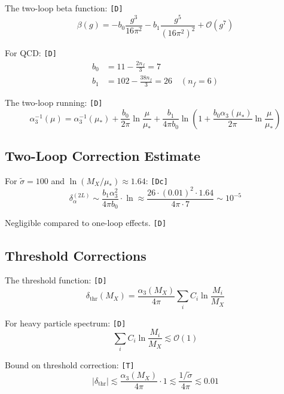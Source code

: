 \documentclass[11pt,a4paper]{article}
\newcommand{\tagD}{\textcolor{green!50!black}{\texttt{[D]}}}
\newcommand{\tagDc}{\textcolor{blue!70!black}{\texttt{[Dc]}}}
\newcommand{\tagT}{\textcolor{cyan!70!black}{\texttt{[T]}}}
\theoremstyle{definition}
\begin{document}
The two-loop beta function: \tagD{}
\begin{equation}
\label{eq:two-loop-beta}
\beta(g) = -b_0 \frac{g^3}{16\pi^2} - b_1 \frac{g^5}{(16\pi^2)^2} + \mathcal{O}(g^7)
\end{equation}

For QCD: \tagD{}
\begin{align}
\label{eq:two-loop-b0}
b_0 &= 11 - \frac{2n_f}{3} = 7 \\
\label{eq:two-loop-b1}
b_1 &= 102 - \frac{38n_f}{3} = 26 \quad (n_f = 6)
\end{align}

The two-loop running: \tagD{}
\begin{equation}
\label{eq:two-loop-run}
\alpha_3^{-1}(\mu) = \alpha_3^{-1}(\mu_*) + \frac{b_0}{2\pi}\ln\frac{\mu}{\mu_*} + \frac{b_1}{4\pi b_0}\ln\left(1 + \frac{b_0\alpha_3(\mu_*)}{2\pi}\ln\frac{\mu}{\mu_*}\right)
\end{equation}

\subsection{Two-Loop Correction Estimate}
\label{app:two-loop-estimate}

For $\tilde{\sigma} = 100$ and $\ln(M_X/\mu_*) \approx 1.64$: \tagDc{}
\begin{equation}
\label{eq:two-loop-corr}
\delta^{(2L)}_{\alpha} \sim \frac{b_1 \alpha_3^2}{4\pi b_0} \cdot \ln \approx \frac{26 \cdot (0.01)^2 \cdot 1.64}{4\pi \cdot 7} \sim 10^{-5}
\end{equation}

Negligible compared to one-loop effects. \tagD{}

\subsection{Threshold Corrections}
\label{app:threshold-detail}

The threshold function: \tagD{}
\begin{equation}
\label{eq:threshold-func}
\delta_{\text{thr}}(M_X) = \frac{\alpha_3(M_X)}{4\pi}\sum_i C_i \ln\frac{M_i}{M_X}
\end{equation}

For heavy particle spectrum: \tagD{}
\begin{equation}
\label{eq:threshold-sum}
\sum_i C_i \ln\frac{M_i}{M_X} \lesssim \mathcal{O}(1)
\end{equation}

Bound on threshold correction: \tagT{}
\begin{equation}
\label{eq:threshold-bound}
|\delta_{\text{thr}}| \lesssim \frac{\alpha_3(M_X)}{4\pi} \cdot 1 \lesssim \frac{1/\tilde{\sigma}}{4\pi} \lesssim 0.01
\end{equation}
\end{document}
